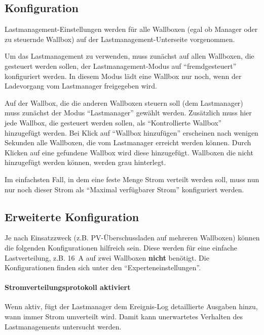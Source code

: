 \documentclass[a4paper,10pt]{article}
\begin{document}
\begin{multicols*}{2}
    \subsection{Konfiguration}
    Lastmanagement-Einstellungen werden für alle Wallboxen (egal ob Manager oder zu steuernde Wallbox) auf der
    Lastmanagement-Unterseite vorgenommen.

    Um das Lastmanagement zu verwenden, muss zunächst auf allen Wallboxen, die gesteuert werden sollen,
    der Lastmanagement-Modus auf \enquote{fremdgesteuert} konfiguriert werden.
    In diesem Modus lädt eine Wallbox nur noch, wenn der Ladevorgang vom Lastmanager freigegeben wird.

    Auf der Wallbox, die die anderen Wallboxen steuern soll (dem Lastmanager) muss zunächst der Modus \enquote{Lastmanager} gewählt werden.
    Zusätzlich muss hier jede Wallbox, die gesteuert werden sollen, als \enquote{Kontrollierte Wallbox} hinzugefügt werden.
    Bei Klick auf \enquote{Wallbox hinzufügen} erscheinen nach wenigen Sekunden alle Wallboxen, die vom Lastmanager erreicht werden können.
    Durch Klicken auf eine gefundene Wallbox wird diese hinzugefügt. Wallboxen die nicht hinzugefügt werden können, werden grau hinterlegt.

    Im einfachsten Fall, in dem eine feste Menge Strom verteilt werden soll, muss nun nur noch dieser
    Strom als \enquote{Maximal verfügbarer Strom} konfiguriert werden.

    \subsection{Erweiterte Konfiguration}
    Je nach Einsatzzweck (z.B. PV-Überschussladen auf mehreren Wallboxen) können die folgenden Konfigurationen hilfreich sein.
    Diese werden für eine einfache Lastverteilung, z.B. \SI{16}{\ampere} auf zwei Wallboxen \textbf{nicht} benötigt.
    Die Konfigurationen finden sich unter den \enquote{Experteneinstellungen}.
    \vspace{-0.2cm}
    \paragraph{Stromverteilungsprotokoll aktiviert}
    Wenn aktiv, fügt der Lastmanager dem Ereignis-Log detaillierte Ausgaben hinzu, wann immer Strom umverteilt wird. Damit kann unerwartetes Verhalten des
    Lastmanagements untersucht werden.


\end{multicols*}
\end{document}
